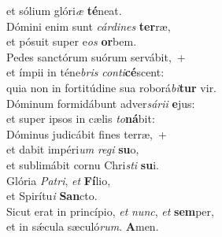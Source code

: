 \evenverse et sólium glóri\textit{æ} \textbf{té}neat.\\
\oddverse Dómini enim sunt \textit{cár}\textit{di}\textit{nes} \textbf{ter}ræ,~\*\\
\oddverse et pósuit super e\textit{os} \textbf{or}bem.\\
\evenverse Pedes sanctórum suórum servábit,~+\\
\evenverse  et ímpii in téne\textit{bris} \textit{con}\textit{ti}\textbf{cé}scent:~\*\\
\evenverse quia non in fortitúdine sua roborá\textit{bi}\textbf{tur} vir.\\
\oddverse Dóminum formidábunt adver\textit{sá}\textit{ri}\textit{i} \textbf{e}jus:~\*\\
\oddverse et super ipsos in cælis \textit{to}\textbf{ná}bit:\\
\evenverse Dóminus judicábit fines terræ,~+\\
\evenverse  et dabit impéri\textit{um} \textit{re}\textit{gi} \textbf{su}o,~\*\\
\evenverse et sublimábit cornu Chri\textit{sti} \textbf{su}i.\\
\oddverse Glória \textit{Pa}\textit{tri}, \textit{et} \textbf{Fí}lio,~\*\\
\oddverse et Spirítu\textit{i} \textbf{San}cto.\\
\evenverse Sicut erat in princípio, \textit{et} \textit{nunc}, \textit{et} \textbf{sem}per,~\*\\
\evenverse et in sǽcula sæculó\textit{rum}. \textbf{A}men.\\
